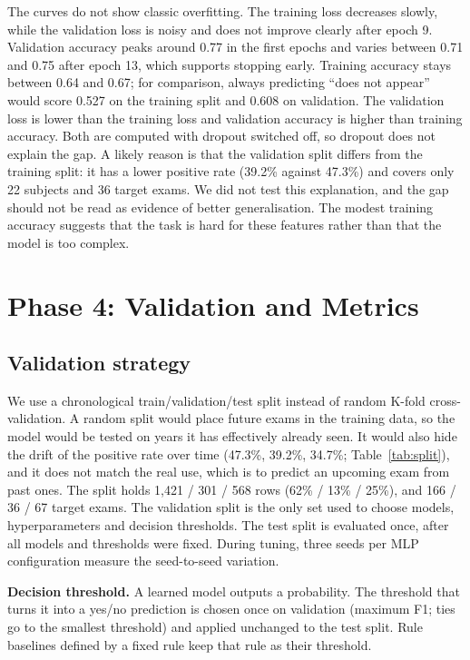 \documentclass[11pt,a4paper]{article}
\begin{document}
The curves do not show classic overfitting. The training loss decreases slowly, while the validation loss is noisy and
does not improve clearly after epoch 9. Validation accuracy peaks around 0.77 in the first epochs and varies between 0.71 and
0.75 after epoch 13, which supports stopping early. Training accuracy stays between 0.64 and 0.67; for comparison,
always predicting ``does not appear'' would score 0.527 on the training split and 0.608 on validation. The validation
loss is lower than the training loss and validation accuracy is higher than training accuracy. Both are computed with
dropout switched off, so dropout does not explain the gap. A likely reason is that the validation split differs from
the training split: it has a lower positive rate (39.2\% against 47.3\%) and covers only 22 subjects and 36 target
exams. We did not test this explanation, and the gap should not be read as evidence of better generalisation. The modest
training accuracy suggests that the task is hard for these features rather than that the model is too complex.

\section{Phase 4: Validation and Metrics}
\label{sec:eval}

\subsection{Validation strategy}
\label{sec:validation}
We use a chronological train/validation/test split instead of random K-fold cross-validation. A random split would place
future exams in the training data, so the model would be tested on years it has effectively already seen. It would also
hide the drift of the positive rate over time (47.3\%, 39.2\%, 34.7\%; Table~\ref{tab:split}), and it does not match the
real use, which is to predict an upcoming exam from past ones. The split holds 1{,}421 / 301 / 568 rows (62\% / 13\% /
25\%), and 166 / 36 / 67 target exams. The validation split is the only set used to choose models, hyperparameters and
decision thresholds. The test split is evaluated once, after all models and thresholds were fixed. During tuning, three
seeds per MLP configuration measure the seed-to-seed variation.

\textbf{Decision threshold.} A learned model outputs a probability. The threshold that turns it into a yes/no
prediction is chosen once on validation (maximum F1; ties go to the smallest threshold) and applied unchanged to the
test split. Rule baselines defined by a fixed rule keep that rule as their threshold.
\end{document}
